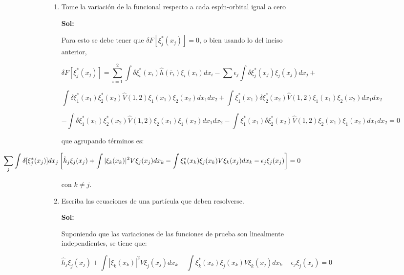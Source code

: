 \documentclass[12pt,a4paper]{article}
\begin{document}
\begin{enumerate}
\begin{enumerate}
    
    
    \item Tome la variación de la funcional respecto a cada espín-orbital igual a cero
    
    \textbf{Sol:}
    
    Para esto se debe tener que $\delta F[\xi_{j}^{*}(x_j)] = 0$, o bien usando lo del inciso anterior,
    
    
    \begin{equation*}
        \delta F[\xi_{j}^{*}(x_j)] =\sum_{i=1}^{2} \int \delta\xi_{i}^{*} (x_i) \hat{h}(\overline{r}_i) \xi_{i} (x_i) dx_i  - \sum \epsilon_j \int\delta\xi_{j}^{*} (x_j) \xi_j (x_j) dx_j+
    \end{equation*}
    
    \begin{equation*}
        \int  \delta \xi_{1}^{*} (x_1) \xi_{2}^{*} (x_2) \hat{V}(1,2)\xi_{1} (x_1) \xi_{2} (x_2) d x_1 dx_2 + \int  \xi_{1}^{*} (x_1) \delta \xi_{2}^{*} (x_2) \hat{V}(1,2)\xi_{1} (x_1) \xi_{2} (x_2) d x_1 dx_2
    \end{equation*}
    
    \begin{equation*}
         - \int  \delta \xi_{1}^{*} (x_1) \xi_{2}^{*} (x_2) \hat{V}(1,2)\xi_{2} (x_1) \xi_{1} (x_2) d x_1 dx_2  - \int  \xi_{1}^{*} (x_1) \delta \xi_{2}^{*} (x_2) \hat{V}(1,2)\xi_{2} (x_1) \xi_{1} (x_2) d x_1 dx_2 = 0
    \end{equation*}
    
    que agrupando términos es:
    
    \begin{equation*}
        \hspace{-3cm}\sum_j \int \delta [\xi_{j}^{*}(x_j)]dx_j \left[\hat{h}_{j}\xi_{j}(x_j)+ \int |\xi_{k}(x_k)|^2 V\xi_j (x_j) dx_k - \int \xi_{k}^{*} (x_k) \xi_j (x_k) V\xi_k (x_j) dx_k -\epsilon_j \xi_j (x_j)\right] = 0
    \end{equation*}
    
    con $k \neq j$.
    
    
    \item Escriba las ecuaciones de una partícula que deben resolverse.
    
    \textbf{Sol:}
    
    Suponiendo que las variaciones de las funciones de prueba son linealmente independientes, se tiene que:
    
    \begin{equation*}
        \hat{h}_{j}\xi_{j}(x_j)+ \int |\xi_{k}(x_k)|^2 V\xi_j (x_j) dx_k - \int \xi_{k}^{*} (x_k) \xi_j (x_k) V\xi_k (x_j) dx_k -\epsilon_j \xi_j (x_j) = 0
    \end{equation*}
    

\end{enumerate}
\end{enumerate}
\end{document}
